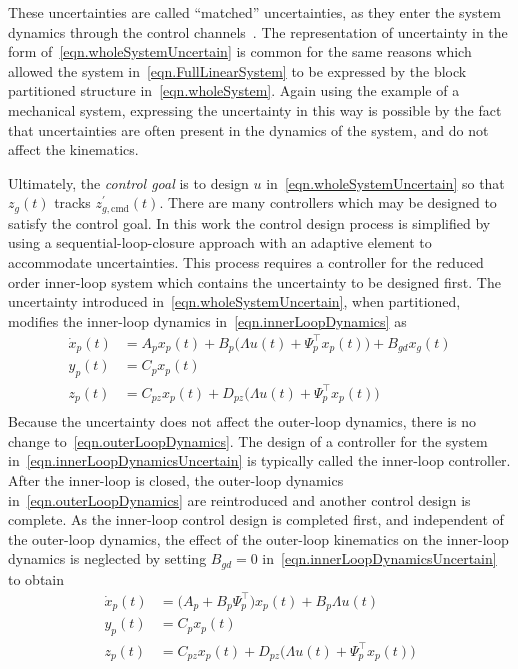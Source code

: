 These uncertainties are called ``matched'' uncertainties, as they enter the system dynamics through the control channels\ \cite{lavretskywise.book.2013}.
The representation of uncertainty in the form of\ \eqref{eqn.wholeSystemUncertain} is common for the same reasons which allowed the system in\ \eqref{eqn.FullLinearSystem} to be expressed by the block partitioned structure in\ \eqref{eqn.wholeSystem}.
Again using the example of a mechanical system, expressing the uncertainty in this way is possible by the fact that uncertainties are often present in the dynamics of the system, and do not affect the kinematics.

Ultimately, the \textit{control goal} is to design $u$ in\ \eqref{eqn.wholeSystemUncertain} so that $z_{g}(t)$ tracks $z_{g,\text{cmd}}^{\prime}(t)$.
There are many controllers which may be designed to satisfy the control goal.
In this work the control design process is simplified by using a sequential-loop-closure approach with an adaptive element to accommodate uncertainties.
This process requires a controller for the reduced order inner-loop system which contains the uncertainty to be designed first.
The uncertainty introduced in\ \eqref{eqn.wholeSystemUncertain}, when partitioned, modifies the inner-loop dynamics in\ \eqref{eqn.innerLoopDynamics} as
\begin{equation}
  \label{eqn.innerLoopDynamicsUncertain}
  \begin{split}
    \dot{x}_{p}(t) &= A_{p}x_{p}(t) + B_{p}\bigr(\Lambda u(t) + \Psi_{p}^{\top}x_{p}(t)\bigr)+B_{gd}x_{g}(t) \\
    y_{p}(t) &= C_{p}x_{p}(t) \\
    z_{p}(t) &= C_{pz}x_{p}(t) + D_{pz}\bigr(\Lambda u(t) + \Psi_{p}^{\top}x_{p}(t)\bigr) \\
  \end{split}
\end{equation}
Because the uncertainty does not affect the outer-loop dynamics, there is no change to\ \eqref{eqn.outerLoopDynamics}.
The design of a controller for the system in\ \eqref{eqn.innerLoopDynamicsUncertain} is typically called the inner-loop controller.
After the inner-loop is closed, the outer-loop dynamics in\ \eqref{eqn.outerLoopDynamics} are reintroduced and another control design is complete.
As the inner-loop control design is completed first, and independent of the outer-loop dynamics, the effect of the outer-loop kinematics on the inner-loop dynamics is neglected by setting $B_{gd}=0$ in\ \eqref{eqn.innerLoopDynamicsUncertain} to obtain
\begin{equation}
  \label{eqn.xdotpunc}
  \begin{split}
    \dot{x}_{p}(t) &= \bigr(A_{p}+B_{p}\Psi_{p}^{\top}\bigr)x_{p}(t) + B_{p}\Lambda u(t) \\
    y_{p}(t) &= C_{p}x_{p}(t) \\
    z_{p}(t) &= C_{pz}x_{p}(t) + D_{pz}\bigr(\Lambda u(t) + \Psi_{p}^{\top}x_{p}(t)\bigr) \\
  \end{split}
\end{equation}
